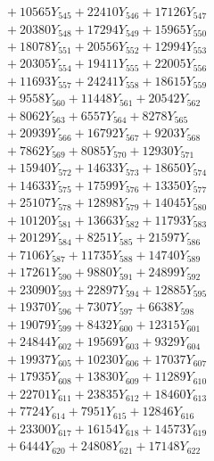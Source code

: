 \documentclass[a4paper,10pt]{article}
\begin{document}
{\begin{align}
&\;  + 10565 Y_{545} + 22410 Y_{546} + 17126 Y_{547} \\[0.3ex]
&\;  + 20380 Y_{548} + 17294 Y_{549} + 15965 Y_{550} \\[0.3ex]
&\;  + 18078 Y_{551} + 20556 Y_{552} + 12994 Y_{553} \\[0.3ex]
&\;  + 20305 Y_{554} + 19411 Y_{555} + 22005 Y_{556} \\[0.3ex]
&\;  + 11693 Y_{557} + 24241 Y_{558} + 18615 Y_{559} \\[0.3ex]
&\;  + 9558 Y_{560} + 11448 Y_{561} + 20542 Y_{562} \\[0.3ex]
&\;  + 8062 Y_{563} + 6557 Y_{564} + 8278 Y_{565} \\[0.3ex]
&\;  + 20939 Y_{566} + 16792 Y_{567} + 9203 Y_{568} \\[0.5ex]\allowbreak
&\;  + 7862 Y_{569} + 8085 Y_{570} + 12930 Y_{571} \\[0.3ex]
&\;  + 15940 Y_{572} + 14633 Y_{573} + 18650 Y_{574} \\[0.3ex]
&\;  + 14633 Y_{575} + 17599 Y_{576} + 13350 Y_{577} \\[0.3ex]
&\;  + 25107 Y_{578} + 12898 Y_{579} + 14045 Y_{580} \\[0.3ex]
&\;  + 10120 Y_{581} + 13663 Y_{582} + 11793 Y_{583} \\[0.3ex]
&\;  + 20129 Y_{584} + 8251 Y_{585} + 21597 Y_{586} \\[0.3ex]
&\;  + 7106 Y_{587} + 11735 Y_{588} + 14740 Y_{589} \\[0.3ex]
&\;  + 17261 Y_{590} + 9880 Y_{591} + 24899 Y_{592} \\[0.3ex]
&\;  + 23090 Y_{593} + 22897 Y_{594} + 12885 Y_{595} \\[0.3ex]
&\;  + 19370 Y_{596} + 7307 Y_{597} + 6638 Y_{598} \\[0.5ex]\allowbreak
&\;  + 19079 Y_{599} + 8432 Y_{600} + 12315 Y_{601} \\[0.3ex]
&\;  + 24844 Y_{602} + 19569 Y_{603} + 9329 Y_{604} \\[0.3ex]
&\;  + 19937 Y_{605} + 10230 Y_{606} + 17037 Y_{607} \\[0.3ex]
&\;  + 17935 Y_{608} + 13830 Y_{609} + 11289 Y_{610} \\[0.3ex]
&\;  + 22701 Y_{611} + 23835 Y_{612} + 18460 Y_{613} \\[0.3ex]
&\;  + 7724 Y_{614} + 7951 Y_{615} + 12846 Y_{616} \\[0.3ex]
&\;  + 23300 Y_{617} + 16154 Y_{618} + 14573 Y_{619} \\[0.3ex]
&\;  + 6444 Y_{620} + 24808 Y_{621} + 17148 Y_{622} \\[0.3ex]

\end{align}}
\end{document}
